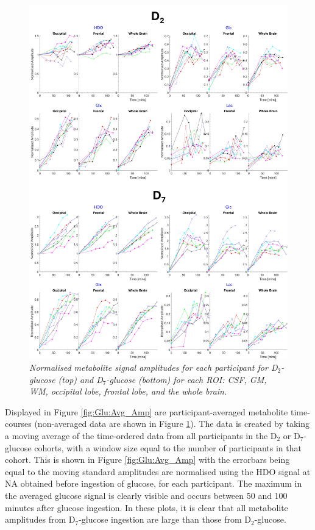 \begin{figure}
    \centering
    \includegraphics[width = 1\textwidth]{Figures/Glucose/Ind_Amp.png}
    \caption{\textit{Normalised metabolite signal amplitudes for each participant for D$_2$-glucose (top) and D$_7$-glucose (bottom) for each \ac{ROI}: \ac{CSF}, \ac{GM}, \ac{WM}, occipital lobe, frontal lobe, and the whole brain.}}
    \label{fig:Glu:Ind_Amp}
\end{figure}

Displayed in Figure \ref{fig:Glu:Avg_Amp} are participant-averaged metabolite time-courses (non-averaged data are shown in Figure \ref{fig:Glu:Ind_Amp}). The data is created by taking a moving average of the time-ordered data from all participants in the D$_2$ or D$_7$-glucose cohorts, with a window size equal to the number of participants in that cohort. This is shown in Figure \ref{fig:Glu:Avg_Amp} with the errorbars being equal to the moving standard  amplitudes are normalised using the \ac{HDO} signal at \ac{NA} obtained before ingestion of glucose, for each participant. The maximum in the averaged glucose signal is clearly visible and occurs between 50 and 100 minutes after glucose ingestion. In these plots, it is clear that all metabolite amplitudes from D$_7$-glucose ingestion are large than those from D$_2$-glucose. 

